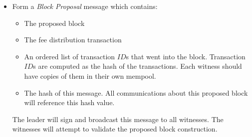 \documentclass[8pt,fleqn,openany]{book}
\begin{document}
\begin{itemize}
{    \begin{itemize}
      \item {Block Type ID, 1}
      \item {Version number}
      \item {Epoch number}
      \item {Previous block hash, computed as the hash of the block header of the current blockchain tip block}
      \item {$\gamma_{blk} = \sum{\gamma_{adj}}$, the sum of all $\gamma_{adj}$ terms found in the block transactions, which includes the $\gamma_{adj}$ from the leader’s fee distribution transaction.}
      \item {Root hash of TXIN Merkle tree}
      \item {Root hash of TXOUT Merkle tree}
      \item {BLS Multi-signature, to be filled in as a result of the consensus on the block.\footnote{We are using pairing-based cryptography to support the use of short, fast, BLS signatures. BLS signatures allow the formation of multi-signatures in one pass over the witness pool.}}
      \item {Bitmap of signers in the multi-signature}
    \end{itemize}}

  The initial contents of the BLS multi-signature slots should be zero filled and, even after being filled in, never contribute to the computation of any \textit{block header hash}. All other slots are concatenated to form a header hash pre-image. But when a full hash of the block is formed for messaging purposes, the entire block, consisting of block header and block body, are considered for the hash pre-image.

  \item{Form a \textit{Block Proposal} message which contains:
    \begin{itemize}
      \item {The proposed block}
      \item {The fee distribution transaction}
      \item {An ordered list of transaction $ID$s that went into the block. Transaction $ID$s are computed as the hash of the transactions. Each witness should have copies of them in their own mempool.}
      \item {The hash of this message. All communications about this proposed block will reference this hash value.}
    \end{itemize}
  The leader will sign and broadcast this message to all witnesses. The witnesses will attempt to validate the proposed block construction.}
\end{itemize}
\end{document}
